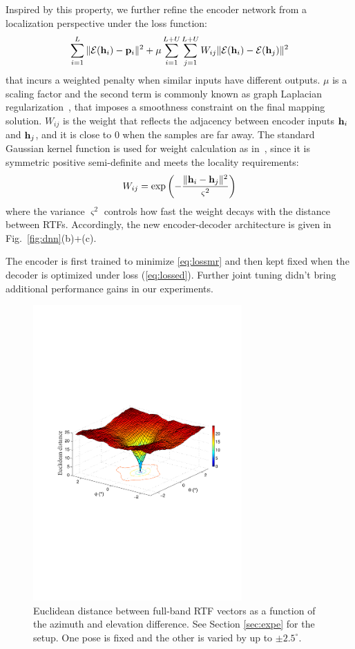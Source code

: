 \documentclass{article}
\begin{document}
Inspired by this property, we further refine the encoder network from a localization perspective under the loss function:
\begin{equation}\label{eq:lossmr}
\sum_{i=1}^{L}\|\mathcal{E}({\bf h}_i)-{\bf p}_i\|^2 + \mu \sum_{i=1}^{L+U}\sum_{j=1}^{L+U}W_{ij}\|\mathcal{E}({\bf h}_i)-\mathcal{E}({\bf h}_j)\|^2
\end{equation}
that incurs a weighted penalty when similar inputs have different outputs. $\mu$ is a scaling factor and the second term is commonly known as graph Laplacian regularization~\cite{Yang2016Revisiting}, that imposes a smoothness constraint on the final mapping solution. $W_{ij}$ is the weight that reflects the adjacency between encoder inputs ${\bf h}_i$ and ${\bf h}_j$, and it is close to 0 when the samples are far away. The standard Gaussian kernel function is used for weight calculation as in~\cite{laufer2016mr}, since it is symmetric positive semi-definite and meets the locality requirements:
\begin{equation}\label{eq:wij}
  W_{ij} = \exp\left(-\frac{\|{\bf h}_i-{\bf h}_j\|^2}{\varsigma^2}\right)
\end{equation}
where the variance $\varsigma^2$ controls how fast the weight decays with the distance between RTFs. Accordingly, the new encoder-decoder architecture is given in Fig.~\ref{fig:dnn}(b)+(c).

The encoder is first trained to minimize \eqref{eq:lossmr} and then kept fixed when the decoder is optimized under loss (\ref{eq:lossed}). Further joint tuning didn't bring additional performance gains in our experiments.

\begin{figure}[tb]
    \centering
    \centerline{\includegraphics[width=8.0cm]{fig2_euc.pdf}}
    \caption{Euclidean distance between full-band RTF vectors as a function of the azimuth and elevation difference. See Section \ref{sec:expe} for the setup. One pose is fixed and the other is varied by up to $\pm 2.5^{\circ}$.}
    \label{fig2}
\end{figure}
\end{document}
